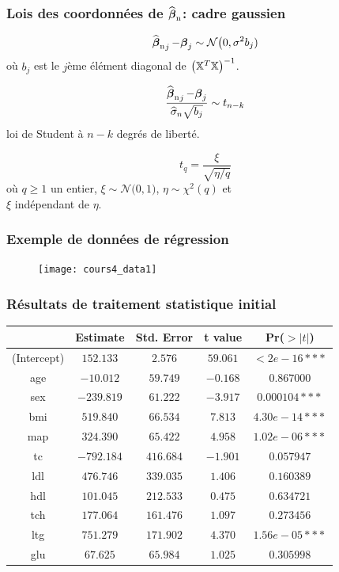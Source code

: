 \begin{frame}
\frametitle{Lois des coordonnées de $\operatorname{\widehat{\boldsymbol{\beta}}_n}$: cadre gaussien}
$$
\operatorname{\widehat{\boldsymbol{\beta}}_n}_j -\boldsymbol{\beta}_j \sim {\mathcal N}\big(0, \sigma^2 b_j)
$$
o\`u $b_j$ est le $j$ème élément diagonal de $\big(\mathbb{X}^T
\mathbb{X}\big)^{-1}$.

$$ \frac{\operatorname{\widehat{\boldsymbol{\beta}}_n}_j -\boldsymbol{\beta}_j}{\widehat \sigma_n \sqrt{b_j}} \sim t_{n-k}$$
\alert{loi de Student \`a $n-k$ degrés de liberté}.

$$ t_q = \frac{\xi}{\sqrt{\eta/q}}$$
o\`u $q\ge 1$ un entier, $\xi\sim {\mathcal N}\big(0,1)$, $\eta\sim
\chi^2(q)$ et\\ $\xi$ \alert{indépendant} de $\eta$.
\end{frame}

\begin{frame}
    \frametitle{Exemple de données de régression}
\begin{figure}
\texttt{[image: cours4\_data1]}
\end{figure}
\end{frame}

\begin{frame}
\frametitle{Résultats de traitement statistique initial}
\begin{tabular}{|c||c|c|c|c|}
\hline &Estimate&Std. Error&t value&Pr($>|t|$)\\\hline
(Intercept) &$152.133$&$2.576$&$59.061$&$< 2e-16***$\\
age&$-10.012$&$59.749$&$ -0.168$&$0.867000$\\\hline
sex &$-239.819$&$61.222$&$-3.917$&$0.000104***$\\
bmi&$519.840$&$66.534$&$7.813$&$4.30e-14***$\\\hline
map&$324.390$&$65.422$&$4.958$&$1.02e-06***$\\
tc&$-792.184$&$416.684$&$-1.901$&$0.057947$\\\hline
ldl&$476.746$&$339.035$&$1.406$&$0.160389$\\
hdl&$101.045$&$212.533 $&$0.475$&$0.634721$\\\hline
tch&$177.064$&$161.476$&$ 1.097$&$0.273456$\\
ltg&$751.279$&$ 171.902$&$4.370$&$ 1.56e-05***$\\\hline
glu&$67.625$&$ 65.984$&$1.025$&$0.305998$\\\hline
\end{tabular}
\end{frame}

